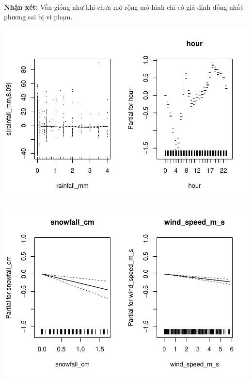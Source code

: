 \documentclass[
  11pt,
  letterpaper,
]{article}
\begin{document}
\textbf{Nhận xét:} Vẫn giống như khi chưa mở rộng mô hình chỉ có giả định đồng nhất phương sai bị vi phạm.

\begin{center}\includegraphics[width=1.2\linewidth,]{Final_Project_files/figure-latex/unnamed-chunk-43-1} \end{center}

\begin{center}\includegraphics[width=1.2\linewidth,]{Final_Project_files/figure-latex/unnamed-chunk-43-2} \end{center}
\end{document}
